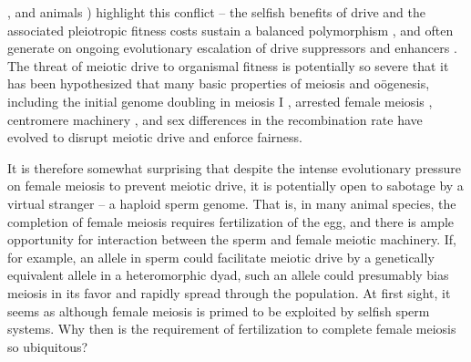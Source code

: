 \documentclass[12pt,letterpaper]{article}
\newcommand{\yb}[1]{{ \color{blue} #1}}
\begin{document}
\citep{Buckler1999,Fishman2005,Fishman2008}, and animals
\citep{Agulnik1990,Wu2005,Pardo-ManuelDeVillena2001c}) highlight this
conflict -- the selfish benefits of drive and the associated
pleiotropic fitness costs sustain a balanced polymorphism
\citep{Prout1973}, 
and often generate on ongoing evolutionary escalation of drive suppressors and enhancers \citep{Dawe1996,Fishman2008}. 
The threat of meiotic drive to organismal fitness is potentially so
severe that it has been hypothesized that many basic properties of
meiosis and o\"{o}genesis, including the initial genome doubling in
meiosis I \citep{Haig1991}, arrested female meiosis
\citep{Mira1998}, centromere machinery \citep{MalikHenikoff}, and sex differences in the recombination rate \citep{Haig2010,Brandvain2012} have evolved to disrupt meiotic drive and enforce fairness.

It is therefore somewhat surprising that despite the intense evolutionary pressure on female meiosis to prevent meiotic drive, 
it is potentially open to sabotage by a virtual stranger -- a haploid sperm genome.
That is, in many animal species, the completion of female meiosis requires fertilization of the egg, 
and there is ample opportunity for interaction between the sperm and female meiotic machinery.
If, for example, an allele in sperm could facilitate meiotic drive by a genetically equivalent allele in a 
heteromorphic dyad, such an allele could presumably bias meiosis in its favor and rapidly spread through the population.
At first sight, it seems as although female meiosis is primed to be exploited by selfish sperm systems.  
\yb{Why then is the requirement of fertilization to complete female meiosis so ubiquitous? }

\end{document}
